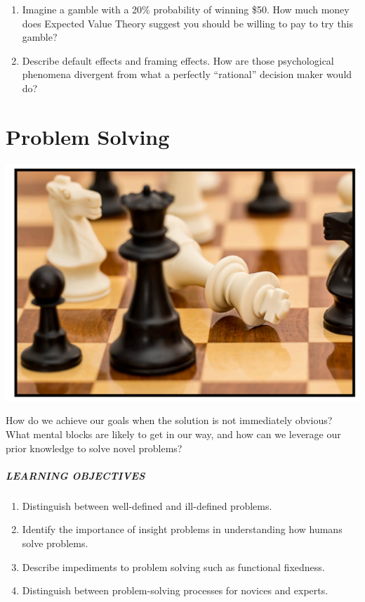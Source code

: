 \documentclass[
]{krantz}
\providecommand{\tightlist}{%
  \setlength{\itemsep}{0pt}\setlength{\parskip}{0pt}}
\begin{document}
\begin{enumerate}
\def\labelenumi{\arabic{enumi}.}
\tightlist
\item
  Imagine a gamble with a 20\% probability of winning \$50. How much money does Expected Value Theory suggest you should be willing to pay to try this gamble?
\item
  Describe default effects and framing effects. How are those psychological phenomena divergent from what a perfectly ``rational'' decision maker would do?
\end{enumerate}

\hypertarget{problem-solving}{%
\chapter{Problem Solving}\label{problem-solving}}

\begin{center}\includegraphics[width=1\linewidth]{images/ch10/cover} \end{center}

How do we achieve our goals when the solution is not immediately obvious? What mental blocks are likely to get in our way, and how can we leverage our prior knowledge to solve novel problems?

\hypertarget{learning-objectives-9}{%
\paragraph*{LEARNING OBJECTIVES}\label{learning-objectives-9}}

\begin{enumerate}
\def\labelenumi{\arabic{enumi}.}
\tightlist
\item
  Distinguish between well-defined and ill-defined problems.
\item
  Identify the importance of insight problems in understanding how humans solve problems.
\item
  Describe impediments to problem solving such as functional fixedness.
\item
  Distinguish between problem-solving processes for novices and experts.
\end{enumerate}
\end{document}
